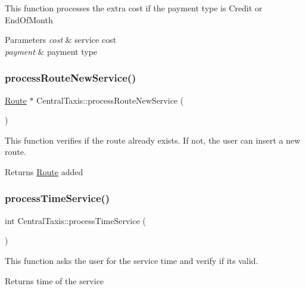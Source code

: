 This function processes the extra cost if the payment type is Credit or End\+Of\+Month 
\begin{DoxyParams}{Parameters}
{\em cost} & service cost \\
\hline
{\em payment} & payment type \\
\hline
\end{DoxyParams}
\hypertarget{classCentralTaxis_a36a8bbc9bb6b7d94d7a635d7244305c4}{}\label{classCentralTaxis_a36a8bbc9bb6b7d94d7a635d7244305c4} 
\subsubsection{\texorpdfstring{process\+Route\+New\+Service()}{processRouteNewService()}}
{\footnotesize\ttfamily \hyperlink{classRoute}{Route} $\ast$ Central\+Taxis\+::process\+Route\+New\+Service (\begin{DoxyParamCaption}{ }\end{DoxyParamCaption})}

This function verifies if the route already exists. If not, the user can insert a new route. \begin{DoxyReturn}{Returns}
\hyperlink{classRoute}{Route} added 
\end{DoxyReturn}
\hypertarget{classCentralTaxis_aae75d9fc9baad1a95b00abeeed8fcb96}{}\label{classCentralTaxis_aae75d9fc9baad1a95b00abeeed8fcb96} 
\subsubsection{\texorpdfstring{process\+Time\+Service()}{processTimeService()}}
{\footnotesize\ttfamily int Central\+Taxis\+::process\+Time\+Service (\begin{DoxyParamCaption}{ }\end{DoxyParamCaption})}

This function asks the user for the service time and verify if it\textquotesingle{}s valid. \begin{DoxyReturn}{Returns}
time of the service 
\end{DoxyReturn}
\hypertarget{classCentralTaxis_a5acf24269ed6bed72b034c13bfb2395d}{}\label{classCentralTaxis_a5acf24269ed6bed72b034c13bfb2395d} 
